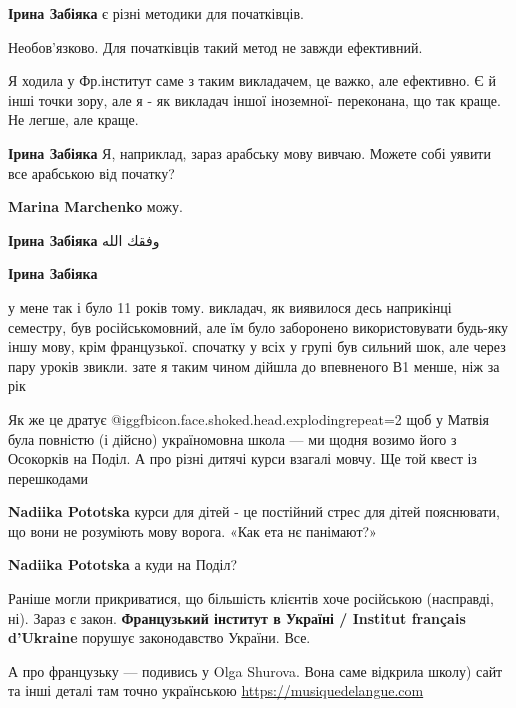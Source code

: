 \begin{itemize}
\begin{itemize}
\textbf{Ірина Забіяка} є різні методики для початківців.

Необов'язково. Для початківців такий метод не завжди ефективний.


Я ходила у Фр.інститут саме з таким викладачем, це важко, але ефективно. Є й
інші точки зору, але я - як викладач іншої іноземної- переконана, що так краще.
Не легше, але краще.


\textbf{Ірина Забіяка} Я, наприклад, зараз арабську мову вивчаю. Можете собі уявити все арабською від початку?

\textbf{Marina Marchenko} можу.

\textbf{Ірина Забіяка} وفقك الله

\textbf{Ірина Забіяка} 

у мене так і було 11 років тому. викладач, як виявилося десь наприкінці
семестру, був російськомовний, але їм було заборонено використовувати будь-яку
іншу мову, крім французької. спочатку у всіх у групі був сильний шок, але через
пару уроків звикли. зате я таким чином дійшла до впевненого В1 менше, ніж за
рік

\end{itemize} %


Як же це дратує  @igg{fbicon.face.shoked.head.exploding}{repeat=2}  щоб у Матвія була повністю (і дійсно) україномовна школа —
ми щодня возимо його з Осокорків на Поділ. А про різні дитячі курси взагалі
мовчу. Ще той квест із перешкодами

\begin{itemize} %
\textbf{Nadiika Pototska} курси для дітей - це постійний стрес для дітей пояснювати, що вони не розуміють мову ворога. «Как ета нє панімают?»

\textbf{Nadiika Pototska} а куди на Поділ?
\end{itemize} %


Раніше могли прикриватися, що більшість клієнтів хоче російською (насправді,
ні). Зараз є закон. \textbf{Французький інститут в Україні / Institut français
d'Ukraine} порушує законодавство України. Все.



А про французьку — подивись у Olga Shurova. Вона саме відкрила школу) сайт та
інші деталі там точно українською \url{https://musiquedelangue.com}


\end{itemize}
